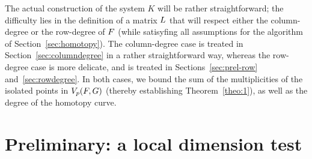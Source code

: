 \documentclass[12pt]{article}
\begin{document}
The actual construction of the system $K$ will be rather
straightforward; the difficulty lies in the definition of a matrix
${L}$ that will respect either the column-degree or the row-degree of
${F}$ (while satisyfing all assumptions for the algorithm of
Section~\ref{sec:homotopy}).  The column-degree case is treated in
Section~\ref{sec:columndegree} in a rather straightforward way,
whereas the row-degree case is more delicate, and is treated in
Sections~\ref{sec:prel-row} and~\ref{sec:rowdegree}. In both cases, we
bound the sum of the multiplicities of the isolated points in $V_{p}({F},G)$ (thereby establishing Theorem~\ref{theo:1}), as well as the
degree of the homotopy curve.





\section{Preliminary: a local dimension test} \label{sec:isolated}
\end{document}
